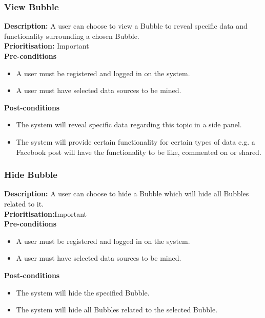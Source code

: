 \documentclass[hidelinks,english]{article}
\begin{document}
			\subsubsection{View Bubble}
				\textbf{Description:}  A user can choose to view a Bubble to reveal specific data and functionality surrounding a chosen Bubble.\\
			    \textbf{Prioritisation:} Important\\
			    \textbf{Pre-conditions}
			    \begin{itemize}
			        \item A user must be registered and logged in on the system.
			        \item A user must have selected data sources to be mined.
			    \end{itemize}
				\textbf{Post-conditions}
				\begin{itemize}
					\item The system will reveal specific data regarding this topic in a side panel.
					\item The system will provide certain functionality for certain types of data e.g. a Facebook post will have the functionality to be like, commented on or shared.
				\end{itemize}
   			\subsubsection{Hide Bubble}
				\textbf{Description:}  A user can choose to hide a Bubble which will hide all Bubbles related to it.\\
			    \textbf{Prioritisation:}Important\\
     			\textbf{Pre-conditions}
				\begin{itemize}
					\item A user must be registered and logged in on the system.
					\item A user must have selected data sources to be mined.
				\end{itemize}
    			\textbf{Post-conditions}
     			\begin{itemize}
			        \item The system will hide the specified Bubble.
			        \item The system will hide all Bubbles related to the selected Bubble.
    			\end{itemize}
\end{document}
